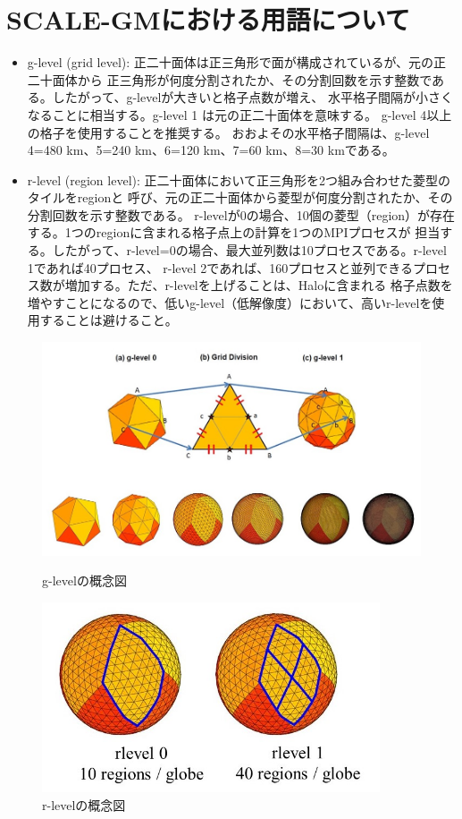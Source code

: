 \section{SCALE-GMにおける用語について}

 \begin{itemize}
   \item g-level (grid level): 正二十面体は正三角形で面が構成されているが、元の正二十面体から
正三角形が何度分割されたか、その分割回数を示す整数である。したがって、g-levelが大きいと格子点数が増え、
水平格子間隔が小さくなることに相当する。g-level 1 は元の正二十面体を意味する。
g-level 4以上の格子を使用することを推奨する。
おおよその水平格子間隔は、g-level 4=480 km、5=240 km、6=120 km、7=60 km、8=30 kmである。
   \item r-level (region level): 正二十面体において正三角形を2つ組み合わせた菱型のタイルをregionと
呼び、元の正二十面体から菱型が何度分割されたか、その分割回数を示す整数である。
r-levelが0の場合、10個の菱型（region）が存在する。1つのregionに含まれる格子点上の計算を1つのMPIプロセスが
担当する。したがって、r-level=0の場合、最大並列数は10プロセスである。r-level 1であれば40プロセス、
r-level 2であれば、160プロセスと並列できるプロセス数が増加する。ただ、r-levelを上げることは、Haloに含まれる
格子点数を増やすことになるので、低いg-level（低解像度）において、高いr-levelを使用することは避けること。
 \end{itemize}

\begin{figure}[H]
\centering
\includegraphics[width=15cm]{g-level_concept.jpg}
\caption{g-levelの概念図}
\centering
\includegraphics[width=10cm]{r-level_concept.jpg}
\caption{r-levelの概念図}
\end{figure}

